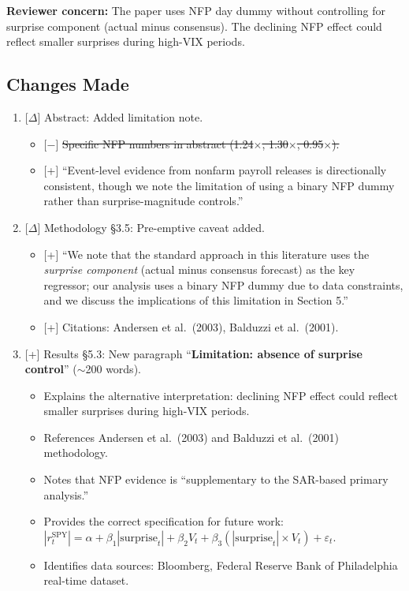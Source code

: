 \documentclass[12pt,a4paper]{article}
\newcommand{\added}[1]{\textcolor{addgreen}{[+] #1}}
\newcommand{\deleted}[1]{\textcolor{delred}{[$-$] \st{#1}}}
\newcommand{\modified}[1]{\textcolor{modblue}{[$\Delta$] #1}}
\begin{document}
\textbf{Reviewer concern:} The paper uses NFP day dummy without controlling for surprise component (actual minus consensus). The declining NFP effect could reflect smaller surprises during high-VIX periods.

\subsection*{Changes Made}

\begin{enumerate}[leftmargin=*]

\item \modified{Abstract: Added limitation note.}
\begin{itemize}
\item \deleted{Specific NFP numbers in abstract (1.24$\times$, 1.30$\times$, 0.95$\times$).}
\item \added{``Event-level evidence from nonfarm payroll releases is directionally consistent, though we note the limitation of using a binary NFP dummy rather than surprise-magnitude controls.''}
\end{itemize}

\item \modified{Methodology \S3.5: Pre-emptive caveat added.}
\begin{itemize}
\item \added{``We note that the standard approach in this literature uses the \textit{surprise component} (actual minus consensus forecast) as the key regressor; our analysis uses a binary NFP dummy due to data constraints, and we discuss the implications of this limitation in Section 5.''}
\item \added{Citations: Andersen et al.\ (2003), Balduzzi et al.\ (2001).}
\end{itemize}

\item \added{Results \S5.3: New paragraph ``\textbf{Limitation: absence of surprise control}'' ($\sim$200 words).}
\begin{itemize}
\item Explains the alternative interpretation: declining NFP effect could reflect smaller surprises during high-VIX periods.
\item References Andersen et al.\ (2003) and Balduzzi et al.\ (2001) methodology.
\item Notes that NFP evidence is ``supplementary to the SAR-based primary analysis.''
\item Provides the correct specification for future work: $|r_t^{\text{SPY}}| = \alpha + \beta_1 |\text{surprise}_t| + \beta_2 V_t + \beta_3 (|\text{surprise}_t| \times V_t) + \varepsilon_t$.
\item Identifies data sources: Bloomberg, Federal Reserve Bank of Philadelphia real-time dataset.
\end{itemize}


\end{enumerate}
\end{document}
